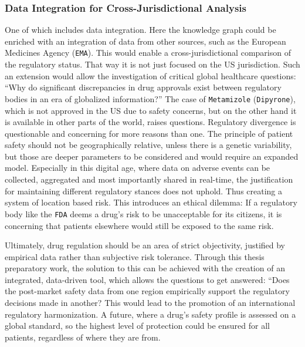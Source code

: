 \subsubsection*{Data Integration for Cross-Jurisdictional Analysis}
One of which includes data integration. Here the knowledge graph could be enriched with an integration of data from other sources, such as the European Medicines Agency (\texttt{EMA}). This would enable a cross-jurisdictional comparison of the regulatory status. That way it is not just focused on the US jurisdiction. Such an extension would allow the investigation of critical global healthcare questions: “Why do significant discrepancies in drug approvals exist between regulatory bodies in an era of globalized information?” The case of \texttt{Metamizole} (\texttt{Dipyrone}), which is not approved in the US due to safety concerns, but on the other hand it is available in other parts of the world, raises questions. Regulatory divergence is questionable and concerning for more reasons than one. The principle of patient safety should not be geographically relative, unless there is a genetic variability, but those are deeper parameters to be considered and would require an expanded model. Especially in this digital age, where data on adverse events can be collected, aggregated and most importantly shared in real-time, the justification for maintaining different regulatory stances does not uphold. Thus creating a system of location based risk. This introduces an ethical dilemma: If a regulatory body like the \texttt{FDA} deems a drug's risk to be unacceptable for its citizens, it is concerning that patients elsewhere would still be exposed to the same risk.

Ultimately, drug regulation should be an area of strict objectivity, justified by empirical data rather than subjective risk tolerance. Through this thesis preparatory work, the solution to this can be achieved with the creation of an integrated, data-driven tool, which allows the questions to get answered: “Does the post-market safety data from one region empirically support the regulatory decisions made in another? This would lead to the promotion of an international regulatory harmonization. A future, where a drug's safety profile is assessed on a global standard, so the highest level of protection could be ensured for all patients, regardless of where they are from.

